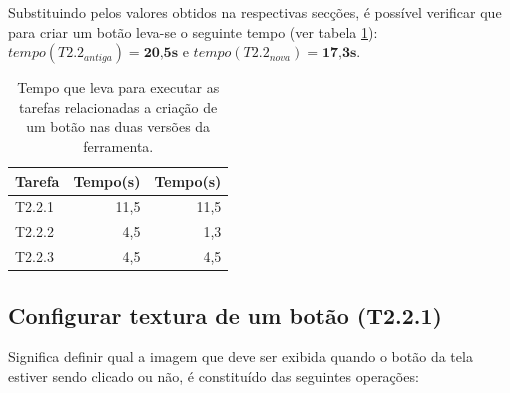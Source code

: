\documentclass[12pt,oneside,openright,a4paper,english,brazil,sumario=tradicional]{abntex2}
\begin{document}
Substituindo pelos valores obtidos na respectivas secções, é possível verificar que para criar um botão leva-se o seguinte tempo (ver tabela \ref{table:botao_tarefas_result}): $tempo(T2.2_{antiga}) = \textbf{20,5s}$ e $tempo(T2.2_{nova})=\textbf{17,3s}$.

\begin{table}[H]
   \centering
   \begin{tabular}{|l|r|r|}
      \hline
      \textbf{Tarefa} & Tempo(s) & Tempo(s) \\
      \hline
      T2.2.1 & 11,5 & 11,5\\
      T2.2.2 & 4,5 & 1,3\\
      T2.2.3 & 4,5 & 4,5\\
      \hline
   \end{tabular}
   \caption{Tempo que leva para executar as tarefas relacionadas a criação de um botão nas duas versões da ferramenta.}
   \label{table:botao_tarefas_result}
\end{table}


\subsection{Configurar textura de um botão (T2.2.1)}
\label{sec:t2.2.1}
Significa definir qual a imagem que deve ser exibida quando o botão da tela estiver sendo clicado ou não, é constituído das seguintes operações:
\end{document}
